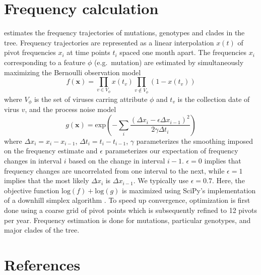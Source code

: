 \section{Frequency calculation}
\augur{} estimates the frequency trajectories of mutations, genotypes and clades in the tree. 
Frequency trajectories are represented as a linear interpolation $x(t)$ of pivot frequencies $x_i$ at time points $t_i$ spaced one month apart. 
The frequencies $x_i$ corresponding to a feature $\phi$ (e.g.\ mutation) are estimated by simultaneously maximizing the Bernoulli observation model 
\begin{equation}
	\label{eq:obs}
	f(\mathbf{x}) = \prod_{v\in V_\phi} x(t_v) \prod_{v\notin V_{\phi}} (1-x(t_v))
\end{equation}
where $V_{\phi}$ is the set of viruses carring attribute $\phi$ and $t_v$ is the collection date of virus $v$, and the process noise model
\begin{equation}
	\label{eq:freq}
	g(\mathbf{x}) = \mathrm{exp}\left(
		-\sum_i \frac{(\Delta x_i - \epsilon\Delta x_{i-1})^2}{2\gamma \Delta t_i}
	\right)
\end{equation}
where $\Delta x_i = x_i-x_{i-1}$, $\Delta t_i = t_i-t_{i-1}$, $\gamma$ parameterizes the smoothing imposed on the frequency estimate and $\epsilon$ parameterizes our expectation of frequency changes in interval $i$ based on the  change in interval $i-1$.
$\epsilon=0$ implies that frequency changes are uncorrelated from one interval to the next, while $\epsilon=1$ implies that the most likely $\Delta x_i$ is $\Delta x_{i-1}$.
We typically use $\epsilon = 0.7$.
Here, the objective function $\mathrm{log}(f) + \mathrm{log}(g)$ is maximized using SciPy's implementation of a downhill simplex algorithm \citep{oliphant_python_2007}.
To speed up convergence, optimization is first done using a coarse grid of pivot points which is subsequently refined to 12 pivots per year. Frequency estimation is done for mutations, particular genotypes, and major clades of the tree.

\section{References}

